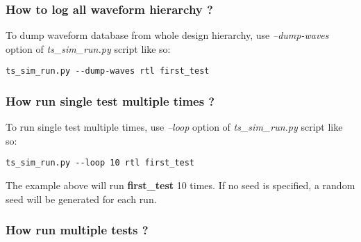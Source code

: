 \documentclass{tropic_design_spec}
\begin{document}
\subsubsection{How to log all waveform hierarchy ?}
\label{sec:how-to-log-all-waveform-hierarchy}

To dump waveform database from whole design hierarchy, use \textit{--dump-waves}
option of \textit{ts_sim_run.py} script like so:

\begin{lstlisting}
ts_sim_run.py --dump-waves rtl first_test
\end{lstlisting}




\subsubsection{How run single test multiple times ?}
\label{sec:how-to-run-single-test-multiple-times}

To run single test multiple times, use \textit{--loop} option of \textit{ts_sim_run.py} script like so:

\begin{lstlisting}
ts_sim_run.py --loop 10 rtl first_test
\end{lstlisting}

The example above will run \textbf{first_test} 10 times. If no seed is specified,
a random seed will be generated for each run.


\subsubsection{How run multiple tests ?}
\label{sec:how-to-run-multiple-tests}
\end{document}
